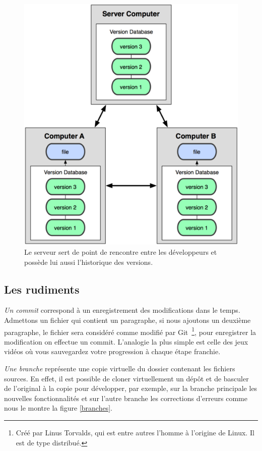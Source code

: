 \begin{figure}
\begin{center}
\includegraphics[scale=0.8]{images/workflow.png}
\caption{Le serveur sert de point de rencontre entre les développeurs et possède
lui aussi l’historique des versions.}
\label{workflow}
\end{center}
\end{figure}

\subsection{Les rudiments}

\emph{Un commit} correspond à un enregistrement des modifications dans le
temps. Admettons un fichier qui contient un paragraphe, si nous ajoutons un
deuxième paragraphe, le fichier sera considéré comme modifié par Git\,
\footnote{Créé par Linus Torvalds, qui est entre autres l'homme à l'origine de
Linux. Il est de type distribué.}, pour enregistrer la modification on effectue
un commit. L'analogie la plus simple est celle des jeux vidéos où vous
sauvegardez votre progression à chaque étape franchie.

\emph{Une branche} représente une \og copie virtuelle \fg{} du dossier
contenant les fichiers sources. En effet, il est possible de cloner
virtuellement un dépôt et de basculer de l'original à la copie pour développer,
par exemple, sur la branche principale les nouvelles fonctionnalités et sur
l'autre branche les corrections d'erreurs comme nous le montre la figure
\ref{branches}.

